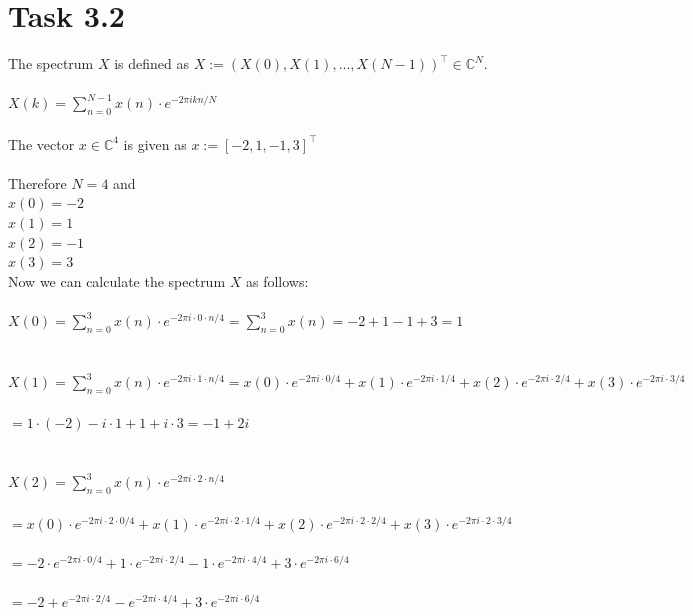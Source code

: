 \documentclass[12pt]{article}
\begin{document}
\section*{Task 3.2}
The spectrum $X$ is defined as $X:=(X(0),X(1),...,X(N-1))^\top \in \mathbb{C}^{N}$.\\\\
$X(k) = \sum_{n=0}^{N-1} x(n) \cdot e^{-2\pi ikn/N}$\\\\
The vector $x \in \mathbb{C}^{4}$ is given as $x:=[-2,1,-1,3]^\top$\\\\
Therefore $N=4$ and\\ 
$x(0)=-2$\\
$x(1)=1$\\
$x(2)=-1$\\ 
$x(3)=3$\\
Now we can calculate the spectrum $X$ as follows:\\\\
$X(0) = \sum_{n=0}^{3} x(n) \cdot e^{-2\pi i \cdot 0 \cdot n/4} = \sum_{n=0}^{3} x(n) = -2+1-1+3 = 1$\\\\\\
$X(1) = \sum_{n=0}^{3} x(n) \cdot e^{-2\pi i \cdot 1 \cdot n/4} = x(0) \cdot e^{-2\pi i \cdot 0/4} + x(1) \cdot e^{-2\pi i \cdot 1/4} + x(2) \cdot e^{-2\pi i \cdot 2/4} + x(3) \cdot e^{-2\pi i \cdot 3/4}$\\\\
$ = 1 \cdot (-2) - i \cdot 1 + 1 + i \cdot 3 = -1 + 2i$\\\\\\
$X(2) = \sum_{n=0}^{3} x(n) \cdot e^{-2\pi i \cdot 2 \cdot n/4}$\\\\ 
$= x(0) \cdot e^{-2\pi i \cdot 2 \cdot 0/4} + x(1) \cdot e^{-2\pi i \cdot 2 \cdot 1/4} + x(2) \cdot e^{-2\pi i \cdot 2 \cdot 2/4} + x(3) \cdot e^{-2\pi i \cdot 2 \cdot 3/4}$\\\\ 
$= -2 \cdot e^{-2\pi i \cdot 0/4} + 1 \cdot e^{-2\pi i \cdot 2/4} -1 \cdot e^{-2\pi i \cdot 4/4} + 3 \cdot e^{-2\pi i \cdot 6/4}$\\\\
$= -2 + e^{-2\pi i \cdot 2/4} - e^{-2\pi i \cdot 4/4} + 3 \cdot e^{-2\pi i \cdot 6/4}$\\\\
\end{document}

